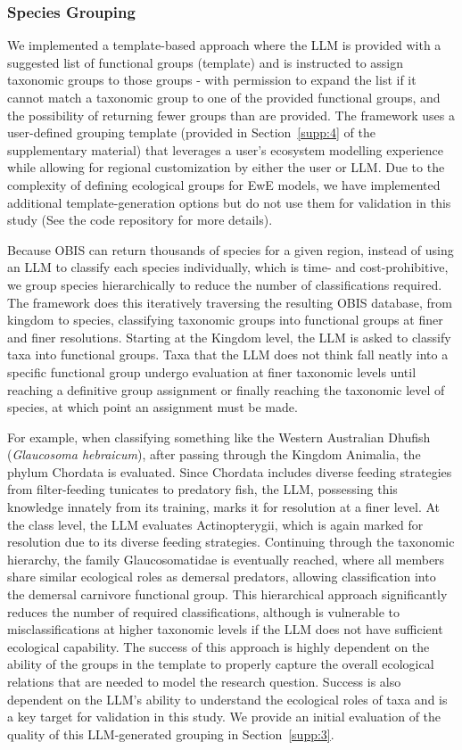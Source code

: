 \subsubsection{Species Grouping}
\label{sec:grouping}
We implemented a template-based approach where the LLM is provided with a suggested list of functional groups (template) and is instructed to assign taxonomic groups to those groups - with permission to expand the list if it cannot match a taxonomic group to one of the provided functional groups, and the possibility of returning fewer groups than are provided. The framework uses a user-defined grouping template (provided in Section~\ref{supp:4} of the supplementary material) that leverages a user's ecosystem modelling experience while allowing for regional customization by either the user or LLM. Due to the complexity of defining ecological groups for EwE models, we have implemented additional template-generation options but do not use them for validation in this study (See the code repository for more details).

Because OBIS can return thousands of species for a given region, instead of using an LLM to classify each species individually, which is time- and cost-prohibitive, we group species hierarchically to reduce the number of classifications required. The framework does this iteratively traversing the resulting OBIS database, from kingdom to species, classifying taxonomic groups into functional groups at finer and finer resolutions. Starting at the Kingdom level, the LLM is asked to classify taxa into functional groups. Taxa that the LLM does not think fall neatly into a specific functional group undergo evaluation at finer taxonomic levels until reaching a definitive group assignment or finally reaching the taxonomic level of species, at which point an assignment must be made. 

For example, when classifying something like the Western Australian Dhufish (\textit{Glaucosoma hebraicum}), after passing through the Kingdom Animalia, the phylum Chordata is evaluated. Since Chordata includes diverse feeding strategies from filter-feeding tunicates to predatory fish, the LLM, possessing this knowledge innately from its training, marks it for resolution at a finer level. At the class level, the LLM evaluates Actinopterygii, which is again marked for resolution due to its diverse feeding strategies. Continuing through the taxonomic hierarchy, the family Glaucosomatidae is eventually reached, where all members share similar ecological roles as demersal predators, allowing classification into the demersal carnivore functional group. This hierarchical approach significantly reduces the number of required classifications, although is vulnerable to misclassifications at higher taxonomic levels if the LLM does not have sufficient ecological capability. The success of this approach is highly dependent on the ability of the groups in the template to properly capture the overall ecological relations that are needed to model the research question. Success is also dependent on the LLM's ability to understand the ecological roles of taxa and is a key target for validation in this study. We provide an initial evaluation of the quality of this LLM-generated grouping in Section~\ref{supp:3}.



